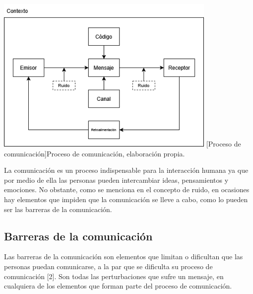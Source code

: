 \begin{center}
    \includegraphics[width=0.8\textwidth]{Images/Cap 2/ProcesoComunicacion.png}
    [Proceso de comunicación]{Proceso de comunicación, elaboración propia.} 
\end{center}

La comunicación es un proceso indispensable para la interacción humana ya que por medio de ella las personas pueden intercambiar ideas, pensamientos y emociones. No obstante, como se menciona en el concepto de ruido, en ocasiones hay elementos que impiden que la comunicación se lleve a cabo, como lo pueden ser las barreras de la comunicación.
\subsection{Barreras de la comunicación}
Las barreras de la comunicación son elementos que limitan o dificultan que las personas puedan comunicarse, a la par que se dificulta su proceso de comunicación [2]. Son todas las perturbaciones que sufre un mensaje, en cualquiera de los elementos que forman parte del proceso de comunicación.

